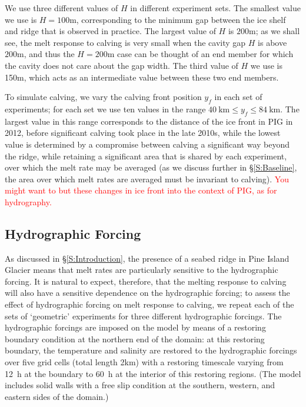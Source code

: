 \documentclass[draft]{agujournal2019}
\newcommand{\red}[1]{\textcolor{red}{#1}}
\begin{document}
We use three different values of $H$ in different experiment sets. The smallest value we use is $H = 100$m, corresponding to the minimum gap between the ice shelf and ridge that is observed in practice. The largest value of $H$ is  $200$m; as we shall see, the melt response to calving is very small when the cavity gap $H$ is above $200$m, and thus the $H = 200$m case can be thought of an end member for which the cavity does not care about the gap width. The third value of $H$ we use is 150m, which acts as an intermediate value between these two end members.

To simulate calving, we vary the calving front position $y_f$ in each set of experiments; for each set we use ten values in the range $40~\text{km} \leq y_f \leq 84~\text{km}$. The largest value in this range corresponds to the distance of the ice front in PIG in 2012, before significant calving took place in the late 2010s, while the lowest value is determined by a compromise between calving a significant way beyond the ridge, while retaining a significant area that is shared by each experiment, over which the melt rate may be averaged (as we discuss further in \S\ref{S:Baseline}, the area over which melt rates are averaged must be invariant to calving). \red{You might want to but these changes in ice front into the context of PIG, as for hydrography.}


\subsection{Hydrographic Forcing}\label{S:Experiment:Hydrography}

As discussed in \S\ref{S:Introduction}, the presence of a seabed ridge in Pine Island Glacier means that melt rates are particularly sensitive to the hydrographic forcing. It is natural to expect, therefore, that the melting response to calving will also have a sensitive dependence on the hydrographic forcing; to assess the effect of hydrographic forcing on melt response to calving, we repeat each of the sets of `geometric' experiments for three different hydrographic forcings. The hydrographic forcings are imposed on the model by means of a restoring boundary condition at the northern end of the domain: at this restoring boundary, the temperature and salinity are restored to the hydrographic forcings over five grid cells (total length 2km) with a restoring timescale varying from 12~h at the boundary to 60~h at the interior of this restoring regions. (The model includes solid walls with a free slip condition at the southern, western, and eastern sides of the domain.)
\end{document}
